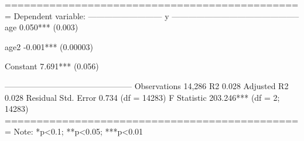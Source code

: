 
===============================================
                        Dependent variable:    
                    ---------------------------
                                 y             
-----------------------------------------------
age                          0.050***          
                              (0.003)          
                                               
age2                         -0.001***         
                             (0.00003)         
                                               
Constant                     7.691***          
                              (0.056)          
                                               
-----------------------------------------------
Observations                  14,286           
R2                             0.028           
Adjusted R2                    0.028           
Residual Std. Error     0.734 (df = 14283)     
F Statistic         203.246*** (df = 2; 14283) 
===============================================
Note:               *p<0.1; **p<0.05; ***p<0.01
